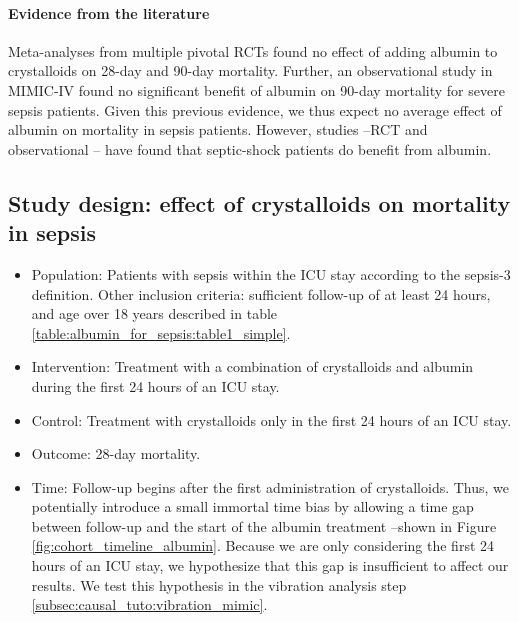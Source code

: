 \documentclass[french,12pt,twoside,a4paper]{book}
\begin{document}
\paragraph{Evidence from the literature}

Meta-analyses from multiple pivotal RCTs
found no effect of adding albumin to crystalloids \citep{li2020resuscitation} on
28-day and 90-day mortality. Further, an observational study in MIMIC-IV
\citep{zhou2021early} found no significant benefit of albumin on 90-day
mortality for severe sepsis patients. Given this previous evidence, we thus expect
no average effect of albumin on mortality in sepsis patients. However,
studies --RCT \citep{caironi2014albumin} and observational
\citep{li2020resuscitation}-- have found that septic-shock
patients do benefit from albumin.

\subsection{Study design: effect of crystalloids on mortality in sepsis}%
\label{subsec:causal_tuto:framing_mimic}%


\begin{itemize}[leftmargin=2ex]
  \item \textcolor{P}{Population}: Patients with sepsis within the ICU stay
        according to the sepsis-3 definition. Other inclusion criteria:
        sufficient follow-up of at least 24 hours, and age over 18 years
        described in table \ref{table:albumin_for_sepsis:table1_simple}.

  \item \textcolor{I}{Intervention}: Treatment with a combination of
        crystalloids and albumin during the first 24 hours of an ICU stay.

  \item \textcolor{C}{Control}: Treatment with crystalloids only in the first 24
        hours of an ICU stay.

  \item \textcolor{O}{Outcome}: 28-day mortality.

  \item \textcolor{T}{Time}: Follow-up begins after the first administration of
        crystalloids. Thus, we potentially introduce a small immortal time bias
        by allowing a time gap between follow-up and the start of the albumin
        treatment --shown in Figure \ref{fig:cohort_timeline_albumin}. Because
        we are only considering the first 24 hours of an ICU stay, we
        hypothesize that this gap is insufficient to affect our results. We test
        this hypothesis in the vibration analysis step
        \ref{subsec:causal_tuto:vibration_mimic}.
\end{itemize}
\end{document}
